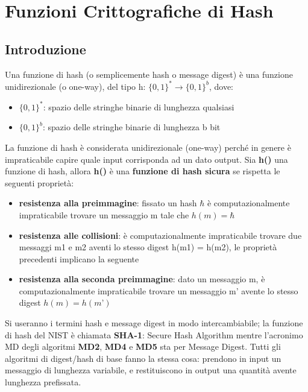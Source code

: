 \chapter{Funzioni Crittografiche di Hash} \label{ch:hash}
\section{Introduzione}
Una funzione di hash (o semplicemente hash o message digest) è una funzione unidirezionale (o one-way), del tipo h: $\{0, 1\}^{*} \rightarrow \{0, 1\}^{b}$, dove:

\begin{itemize}
	\item $\{0, 1\}^{*}$: spazio delle stringhe binarie di lunghezza qualsiasi
	\item $\{0, 1\}^{b}$: spazio delle stringhe binarie di lunghezza b bit
\end{itemize}

La funzione di hash è considerata unidirezionale (one-way) perché in genere è impraticabile capire quale input corrisponda ad un dato output. Sia \textbf{h()} una funzione di hash, allora \textbf{h()} è una \textbf{funzione di hash sicura} se rispetta le seguenti proprietà:

\begin{itemize}
	\item \textbf{resistenza alla preimmagine}: fissato un hash $\hbar$ è computazionalmente impraticabile trovare un messaggio m tale che $h(m) = \hbar$
	\item \textbf{resistenza alle collisioni}: è computazionalmente	impraticabile trovare due messaggi m1 e m2 aventi lo 	stesso digest h(m1) = h(m2), le proprietà precedenti implicano la seguente
	\item \textbf{resistenza alla seconda preimmagine}: dato un messaggio m, è computazionalmente impraticabile trovare un	messaggio m’ avente lo stesso digest $h(m) = h(m’)$
\end{itemize}


Si useranno i termini hash e message digest in modo intercambiabile; la funzione di hash del NIST è chiamata \textbf{SHA-1}: Secure Hash Algorithm mentre l'acronimo MD degli algoritmi \textbf{MD2}, \textbf{MD4} e \textbf{MD5} sta per Message Digest. Tutti gli algoritmi di digest/hash di base fanno la stessa cosa: prendono in input un messaggio di lunghezza variabile, e restituiscono in output una quantità avente lunghezza prefissata. \newline \newline

